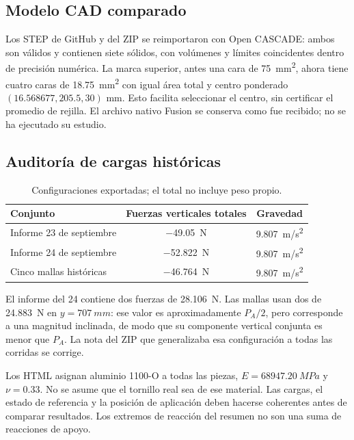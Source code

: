 \documentclass[11pt,a4paper]{article}
\begin{document}
\subsection{Modelo CAD comparado}
Los STEP de GitHub y del ZIP se reimportaron con Open CASCADE: ambos son válidos y contienen siete sólidos, con volúmenes y límites coincidentes dentro de precisión numérica. La marca superior, antes una cara de \SI{75}{mm^2}, ahora tiene cuatro caras de \SI{18.75}{mm^2} con igual área total y centro ponderado $(16.568677,205.5,30)$ mm. Esto facilita seleccionar el centro, sin certificar el promedio de rejilla. El archivo nativo Fusion se conserva como fue recibido; no se ha ejecutado su estudio.

\subsection{Auditoría de cargas históricas}
\begin{table}[H]\centering\small
\caption{Configuraciones exportadas; el total no incluye peso propio.}
\begin{tabular}{@{}lcc@{}}\toprule
Conjunto & Fuerzas verticales totales & Gravedad \\\midrule
Informe 23 de septiembre & \SI{-49.05}{N} & \SI{9.807}{m/s^2} \\
Informe 24 de septiembre & \SI{-52.822}{N} & \SI{9.807}{m/s^2} \\
Cinco mallas históricas & \SI{-46.764}{N} & \SI{9.807}{m/s^2} \\
\bottomrule\end{tabular}\end{table}
El informe del 24 contiene dos fuerzas de \SI{28.106}{N}. Las mallas usan dos de \SI{24.883}{N} en $y=\SI{707}{mm}$: ese valor es aproximadamente $P_A/2$, pero corresponde a una magnitud inclinada, de modo que su componente vertical conjunta es menor que $P_A$. La nota del ZIP que generalizaba esa configuración a todas las corridas se corrige.

Los HTML asignan aluminio 1100-O a todas las piezas, $E=\SI{68947.20}{MPa}$ y $\nu=0.33$. No se asume que el tornillo real sea de ese material. Las cargas, el estado de referencia y la posición de aplicación deben hacerse coherentes antes de comparar resultados. Los extremos de reacción del resumen no son una suma de reacciones de apoyo.
\end{document}
